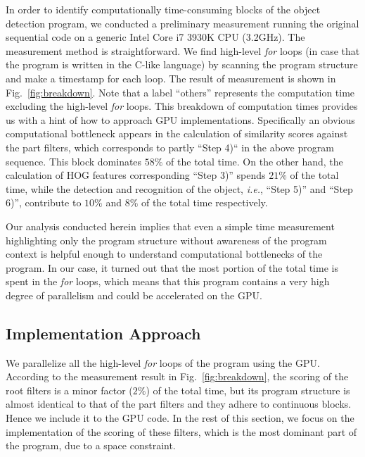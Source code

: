 In order to identify computationally time-consuming blocks of the object
detection program, we conducted a preliminary measurement running the
original sequential code \cite{Niknejad12} on a generic Intel Core i7
3930K CPU (3.2GHz).
The measurement method is straightforward.
We find high-level \textit{for} loops (in case that the program is
written in the C-like language) by scanning the program structure and
make a timestamp for each loop.
The result of measurement is shown in Fig.~\ref{fig:breakdown}.
Note that a label ``others'' represents the computation time excluding
the high-level \textit{for} loops.
This breakdown of computation times provides us with a hint of how to
approach GPU implementations.
Specifically an obvious computational bottleneck appears in the
calculation of similarity scores against the part filters, which
corresponds to partly ``Step 4)`` in the above program sequence.
This block dominates $58\%$ of the total time.
On the other hand, the calculation of HOG features corresponding ``Step
3)'' spends $21\%$ of the total time, while the detection and recognition
of the object, \textit{i.e.}, ``Step 5)'' and ``Step 6)'', contribute to
$10\%$ and $8\%$ of the total time respectively.

Our analysis conducted herein implies that even a simple time
measurement highlighting only the program structure without awareness of
the program context is helpful enough to understand computational
bottlenecks of the program.
In our case, it turned out that the most portion of the total time is
spent in the \textit{for} loops, which means that this program contains
a very high degree of parallelism and could be accelerated on the GPU.

\subsection{Implementation Approach}

We parallelize all the high-level \textit{for} loops of the program
using the GPU.
According to the measurement result in Fig.~\ref{fig:breakdown}, the
scoring of the root filters is a minor factor ($2\%$) of the total
time, but its program structure is almost identical to that of the part
filters and they adhere to continuous blocks.
Hence we include it to the GPU code.
In the rest of this section, we focus on the implementation of the
scoring of these filters, which is the most dominant part of the
program, due to a space constraint.

